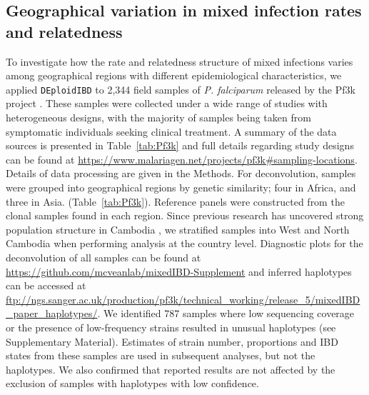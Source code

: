 \documentclass[9pt,lineno]{elife}
\begin{document}



\subsection{Geographical variation in mixed infection rates and relatedness}

To investigate how the rate and relatedness structure of mixed infections varies among geographical regions with different epidemiological characteristics, we applied \texttt{DEploidIBD} to 2,344 field samples of {\it P. falciparum} released by the Pf3k project \citep{pf3k}.  These samples were collected under a wide range of studies with heterogeneous designs, with the majority of samples being taken from symptomatic individuals seeking clinical treatment. A summary of the data sources is presented in Table~\ref{tab:Pf3k} and full details regarding study designs can be found at \url{https://www.malariagen.net/projects/pf3k#sampling-locations}.  Details of data processing are given in the Methods. For deconvolution, samples were grouped into geographical regions by genetic similarity; four in Africa, and three in Asia. (Table~\ref{tab:Pf3k}). Reference panels were constructed from the clonal samples found in each region. Since previous research has uncovered strong population structure in Cambodia \citep{Miotto2013}, we stratified samples into West and North Cambodia when performing analysis at the country level. Diagnostic plots for the deconvolution of all samples can be found at \url{https://github.com/mcveanlab/mixedIBD-Supplement} and inferred haplotypes can be accessed at \url{ftp://ngs.sanger.ac.uk/production/pf3k/technical_working/release_5/mixedIBD_paper_haplotypes/}.  We identified 787 samples where low sequencing coverage or the presence of low-frequency strains resulted in unusual haplotypes (see Supplementary Material).  Estimates of strain number, proportions and IBD states from these samples are used in subsequent analyses, but not the haplotypes.  We also confirmed that reported results are not affected by the exclusion of samples with haplotypes with low confidence.
\end{document}
